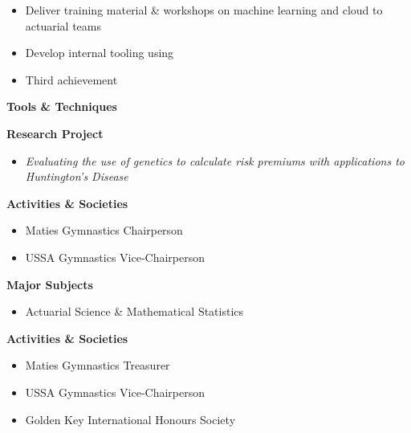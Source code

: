 \documentclass[10pt,a4paper,ragged2e,withhyper]{altacv}
\begin{document}
\begin{paracol}{2}
            \begin{itemize}
	      \item Deliver training material \& workshops on machine learning and cloud to actuarial teams
                \item Develop internal tooling using
                \item Third achievement
            \end{itemize}
	    \textbf{Tools \& Techniques}
        
            \divider
            
        
	    \textbf{Research Project}
            \begin{itemize}
                \item \textit{Evaluating the use of genetics to calculate risk premiums with applications to Huntington's Disease}
            \end{itemize}
	    \textbf{Activities \& Societies}
            \begin{itemize}
	      \item Maties Gymnastics Chairperson
	      \item USSA Gymnastics Vice-Chairperson
            \end{itemize}
            \divider
            
	    \textbf{Major Subjects}
            \begin{itemize}
	      \item Actuarial Science \& Mathematical Statistics
            \end{itemize}
	    \textbf{Activities \& Societies}
            \begin{itemize}
	      \item Maties Gymnastics Treasurer
	      \item USSA Gymnastics Vice-Chairperson
	      \item Golden Key International Honours Society 
            \end{itemize}
        

\end{paracol}
\end{document}
